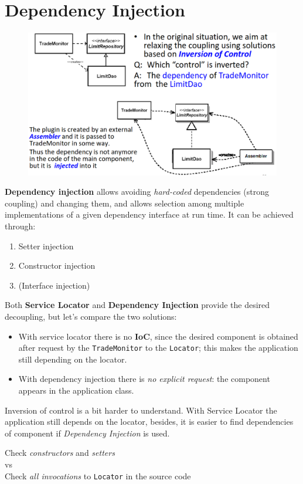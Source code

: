 \section{Dependency Injection}

\begin{figure}[htbp]
   \centering
   \includegraphics{images/dependency_inj.png}
   \label{fig:dependency_inj}
\end{figure}

\textbf{Dependency injection} allows avoiding \textit{hard-coded}
dependencies (strong coupling) and changing them, and allows selection among multiple implementations of a given dependency interface at run time.
It can be achieved through:
\begin{enumerate}
   \item Setter injection
   \item Constructor injection
   \item (Interface injection)
\end{enumerate}

Both \textbf{Service Locator} and \textbf{Dependency Injection} provide
the desired decoupling, but let's compare the two solutions: 
\begin{itemize}
   \item 
   With service locator there is no \textbf{IoC}, since the desired component is obtained
   after request by the \texttt{TradeMonitor} to the \texttt{Locator};
   this makes the application still depending on the locator.
   \item With dependency injection there is \textit{no explicit request}: the
   component appears in the application class.
\end{itemize}
Inversion of control is a bit harder to understand.
With Service Locator the application still depends on the
locator, besides, it is easier to find dependencies of component if \textit{Dependency Injection} is used.
\begin{center}
   \color{darkgray}
   Check \textit{constructors} and \textit{setters}\\vs\\Check \textit{all invocations} to
   \texttt{Locator} in the source code
\end{center}

